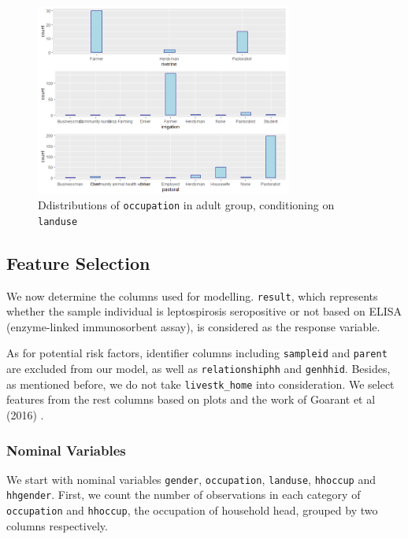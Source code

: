 \documentclass[11pt,twoside]{article}
\numberwithin{Theorem}{section}
\numberwithin{Definition}{section}
\numberwithin{Lemma}{section}
\numberwithin{Algorithm}{section}
\numberwithin{equation}{section}
\begin{document}
\begin{figure}[!h]
	\centering
	\includegraphics[width = 0.75\textwidth]{Images/occupation_landuse.png}
	\caption{Ddistributions of \texttt{occupation} in adult group, conditioning on \texttt{landuse}}
	\label{fig:occ3}		
\end{figure} 

\subsection{Feature Selection}

We now determine the columns used for modelling. \texttt{result}, which represents whether the sample individual is leptospirosis seropositive or not based on ELISA (enzyme-linked immunosorbent assay), is considered as the response variable. 

As for potential risk factors, identifier columns including \texttt{sampleid} and \texttt{parent} are excluded from our model, as well as \texttt{relationshiphh} and \texttt{genhhid}. Besides, as mentioned before, we do not take \texttt{livestk\_home} into consideration. We select features from the rest columns based on plots and the work of Goarant et al (2016) \cite{goarant2016leptospirosis}. 

\subsubsection{Nominal Variables}

We start with nominal variables \texttt{gender}, \texttt{occupation}, \texttt{landuse}, \texttt{hhoccup} and \texttt{hhgender}. First, we count the number of observations in each category of \texttt{occupation} and \texttt{hhoccup}, the occupation of household head, grouped by two columns respectively.
\end{document}
